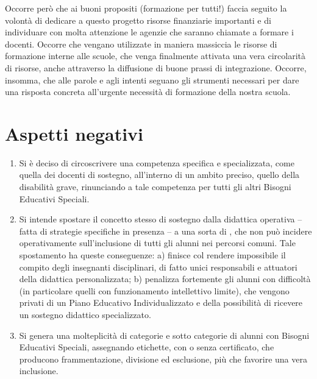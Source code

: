 \begin{enumerate}
	Occorre però che ai buoni propositi (formazione per tutti!) faccia seguito la volontà di dedicare a questo progetto risorse finanziarie importanti e di individuare con molta attenzione le agenzie che saranno chiamate a formare i docenti. Occorre che vengano utilizzate in maniera massiccia le risorse di formazione interne alle scuole, che venga finalmente attivata una vera circolarità di risorse, anche attraverso la diffusione di buone prassi di integrazione. Occorre, insomma, che alle parole e agli intenti seguano gli strumenti necessari per dare una risposta concreta all'urgente necessità di formazione della nostra scuola.
\end{enumerate}
\section*{Aspetti negativi}
\begin{enumerate}
	\item Si è deciso di circoscrivere una competenza specifica e specializzata, come quella dei docenti di sostegno, all'interno di un ambito preciso, quello della disabilità grave, rinunciando a tale competenza per tutti gli altri Bisogni Educativi Speciali.
	\item  Si intende spostare il concetto stesso di sostegno dalla didattica operativa – fatta di strategie specifiche in presenza – a una sorta di , che non può incidere operativamente sull'inclusione di tutti gli alunni nei percorsi comuni. Tale spostamento ha queste conseguenze: a) finisce col rendere impossibile il compito degli insegnanti disciplinari, di fatto unici responsabili e attuatori della didattica personalizzata; b) penalizza fortemente gli alunni con difficoltà (in particolare quelli con funzionamento intellettivo limite), che vengono privati di un Piano Educativo Individualizzato e della possibilità di ricevere un sostegno didattico specializzato.
	\item Si genera una molteplicità di categorie e sotto categorie di alunni con Bisogni Educativi Speciali, assegnando etichette, con o senza certificato, che producono frammentazione, divisione ed esclusione, più che favorire una vera inclusione.
\end{enumerate}

